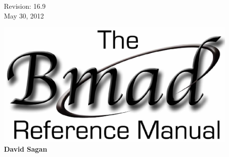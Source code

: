 \thispagestyle{empty}

\begin{flushright}
\large
  Revision: 16.9 \\
  May 30, 2012 \\
\end{flushright}

\vfill

{
\begin{center}
\includegraphics[width=12cm]{bmad-ref-manual.pdf} \\
\vskip 0.3in
\huge\bf David Sagan
\end{center}
}

\vfill
\break

